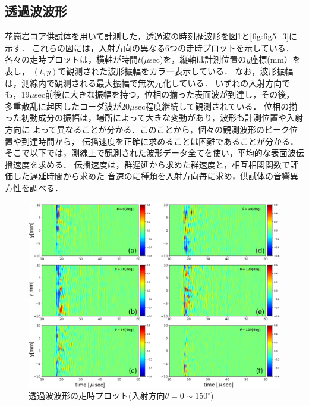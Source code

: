 \subsection{透過波波形}
花崗岩コア供試体を用いて計測した，透過波の時刻歴波形を図\ref{fig:fig5_2}と\ref{fig:fig5_3}に示す．
これらの図には，入射方向の異なる6つの走時プロットを示している．
各々の走時プロットは，横軸が時間$t$($\mu$sec)を，縦軸は計測位置の$y$座標(mm）を表し，
$(t,y)$で観測された波形振幅をカラー表示している．
なお，波形振幅は，測線内で観測される最大振幅で無次元化している．
いずれの入射方向でも，19$\mu$sec前後に大きな振幅を持つ，位相の揃った表面波が到達し，その後，
多重散乱に起因したコーダ波が20$\mu$sec程度継続して観測されている．
位相の揃った初動成分の振幅は，場所によって大きな変動があり，波形も計測位置や入射方向に
よって異なることが分かる．このことから，個々の観測波形のピーク位置や到達時間から，
伝播速度を正確に求めることは困難であることが分かる．
そこで以下では，測線上で観測された波形データ全てを使い，平均的な表面波伝播速度を求める．
伝播速度は，群遅延から求めた群速度と，相互相関関数で評価した遅延時間から求めた
音速のに種類を入射方向毎に求め，供試体の音響異方性を調べる．
\begin{figure}[h]
	\begin{center}
	\includegraphics[width=1.0\linewidth]{Figs/fig5_2.eps} 
	\end{center}
	\caption{
		透過波波形の走時プロット(入射方向$\theta=0\sim 150^{\circ}$)
	} 
	\label{fig:fig5_2}
\end{figure}
